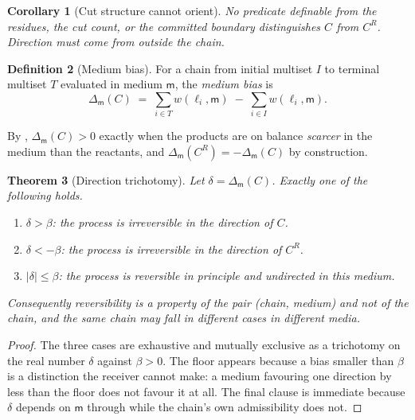 \documentclass[11pt,twocolumn,a4paper]{article}
\theoremstyle{thmstyle}
\newtheorem{theorem}{Theorem}[section]
\newtheorem{corollary}[theorem]{Corollary}
\theoremstyle{definition}
\newtheorem{definition}[theorem]{Definition}
\theoremstyle{remark}
\newcommand{\med}{\mathsf{m}}
\newcommand{\flo}{\beta}
\newcommand{\abs}[1]{\lvert#1\rvert}
\begin{document}
\begin{corollary}[Cut structure cannot orient]
\label{cor:cannotorient}
No predicate definable from the residues, the cut count, or the committed
boundary distinguishes $C$ from $C^R$. Direction must come from outside the
chain.
\end{corollary}

\begin{definition}[Medium bias]
\label{def:bias}
For a chain from initial multiset $I$ to terminal multiset $T$ evaluated in
medium $\med$, the \emph{medium bias} is
\begin{equation}
\Delta_\med(C) \;=\; \sum_{i \in T} w(\ell_i,\med)
                  \;-\; \sum_{i \in I} w(\ell_i,\med).
\label{eq:bias}
\end{equation}
\end{definition}

By , $\Delta_\med(C)>0$ exactly when the products are on
balance \emph{scarcer} in the medium than the reactants, and
$\Delta_\med(C^R)=-\Delta_\med(C)$ by construction.

\begin{theorem}[Direction trichotomy]
\label{thm:trichotomy}
Let $\delta=\Delta_\med(C)$. Exactly one of the following holds.
\begin{enumerate}[label=(\alph*),leftmargin=2.2em]
\item $\delta > \flo$: the process is irreversible in the direction of $C$.
\item $\delta < -\flo$: the process is irreversible in the direction of $C^R$.
\item $\abs{\delta} \leq \flo$: the process is reversible in principle and
      undirected in this medium.
\end{enumerate}
Consequently reversibility is a property of the pair (chain, medium) and not
of the chain, and the same chain may fall in different cases in different
media.
\end{theorem}

\begin{proof}
The three cases are exhaustive and mutually exclusive as a trichotomy on the
real number $\delta$ against $\flo>0$. The floor appears because a bias
smaller than $\flo$ is a distinction the receiver cannot make: a medium
favouring one direction by less than the floor does not favour it at all. The
final clause is immediate because $\delta$ depends on $\med$ through
 while the chain's own admissibility does not.
\end{proof}
\end{document}
